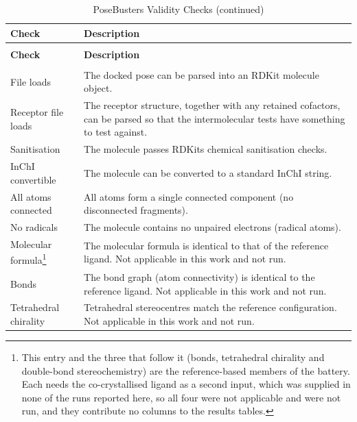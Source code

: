 \begin{longtable}[]{@{}
  >{\raggedright\arraybackslash}p{}
  >{\raggedright\arraybackslash}p{}@{}}
\caption[PoseBusters Validity Checks]{PoseBusters Validity Checks}\label{tab:appendix-posebusters-checks}\tabularnewline
\toprule\noalign{}
{\raggedright \textbf{Check}} & {\raggedright \textbf{Description}} \\
\midrule\noalign{}
\endfirsthead
\caption[]{PoseBusters Validity Checks (continued)}\tabularnewline
\toprule\noalign{}
{\raggedright \textbf{Check}} & {\raggedright \textbf{Description}} \\
\midrule\noalign{}
\endhead
\bottomrule\noalign{}
\endlastfoot
\multicolumn{2}{@{}l@{}}{%
\textbf{Chemical validity and consistency}} \\
File loads & The docked pose can be parsed into an RDKit molecule object. \\
Receptor file loads & The receptor structure, together with any retained cofactors, can be parsed so that the intermolecular tests have something to test against. \\
Sanitisation & The molecule passes RDKit\textquotesingle{}s chemical sanitisation checks. \\
InChI convertible & The molecule can be converted to a standard InChI string. \\
All atoms connected & All atoms form a single connected component (no disconnected fragments). \\
No radicals & The molecule contains no unpaired electrons (radical atoms). \\
Molecular formula\footnote{This entry and the three that follow it (bonds, tetrahedral chirality and double-bond stereochemistry) are the reference-based members of the battery. Each needs the co-crystallised ligand as a second input, which was supplied in none of the runs reported here, so all four were not applicable and were not run, and they contribute no columns to the results tables.} & The molecular formula is identical to that of the reference ligand. Not applicable in this work and not run. \\
Bonds & The bond graph (atom connectivity) is identical to the reference ligand. Not applicable in this work and not run. \\
Tetrahedral chirality & Tetrahedral stereocentres match the reference configuration. Not applicable in this work and not run. \\

\end{longtable}
